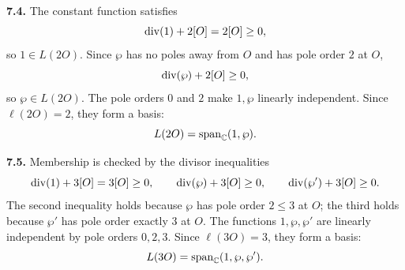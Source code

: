 \begin{center}
\end{center}

\textbf{7.4.} The constant function satisfies
\[
  \operatorname{div}(1)+2[O]=2[O]\ge0,
\]
so \(1\in L(2O)\).  Since \(\wp\) has no poles away from \(O\) and has pole
order \(2\) at \(O\),
\[
  \operatorname{div}(\wp)+2[O]\ge0,
\]
so \(\wp\in L(2O)\).  The pole orders \(0\) and \(2\) make \(1,\wp\) linearly
independent.  Since \(\ell(2O)=2\), they form a basis:
\[
  L(2O)=\operatorname{span}_{\mathbb{C}}(1,\wp).
\]

\begin{center}
\end{center}

\textbf{7.5.} Membership is checked by the divisor inequalities
\[
  \operatorname{div}(1)+3[O]=3[O]\ge0,\qquad
  \operatorname{div}(\wp)+3[O]\ge0,\qquad
  \operatorname{div}(\wp')+3[O]\ge0.
\]
The second inequality holds because \(\wp\) has pole order \(2\le3\) at \(O\);
the third holds because \(\wp'\) has pole order exactly \(3\) at \(O\).  The
functions \(1,\wp,\wp'\) are linearly independent by pole orders \(0,2,3\).
Since \(\ell(3O)=3\), they form a basis:
\[
  L(3O)=\operatorname{span}_{\mathbb{C}}(1,\wp,\wp').
\]

